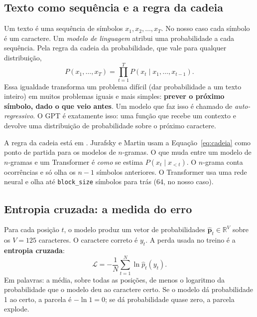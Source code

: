 \documentclass[11pt,a4paper]{article}
\newcommand{\R}{\mathbb{R}}
\begin{document}
\subsection{Texto como sequência e a regra da cadeia}

Um texto é uma sequência de símbolos $x_1, x_2, \dots, x_T$. No nosso caso cada símbolo é um caractere. Um \emph{modelo de linguagem} atribui uma probabilidade a cada sequência. Pela regra da cadeia da probabilidade, que vale para qualquer distribuição,
\begin{equation}
P(x_1, \dots, x_T) = \prod_{t=1}^{T} P(x_t \mid x_1, \dots, x_{t-1}).
\label{eq:cadeia}
\end{equation}
Essa igualdade transforma um problema difícil (dar probabilidade a um texto inteiro) em muitos problemas iguais e mais simples: \textbf{prever o próximo símbolo, dado o que veio antes}. Um modelo que faz isso é chamado de \emph{auto-regressivo}. O GPT é exatamente isso: uma função que recebe um contexto e devolve uma distribuição de probabilidade sobre o próximo caractere.

\begin{teoria}
A regra da cadeia está em \cite[cap.~3]{goodfellow}. Jurafsky e Martin \cite[cap.~3]{jurafsky} usam a Equação~\eqref{eq:cadeia} como ponto de partida para os modelos de $n$-gramas. O que muda entre um modelo de $n$-gramas e um Transformer é \emph{como} se estima $P(x_t \mid x_{<t})$. O $n$-grama conta ocorrências e só olha os $n-1$ símbolos anteriores. O Transformer usa uma rede neural e olha até \texttt{block\_size} símbolos para trás (64, no nosso caso).
\end{teoria}

\subsection{Entropia cruzada: a medida do erro}

Para cada posição $t$, o modelo produz um vetor de probabilidades $\hat{\bm p}_t \in \R^{V}$ sobre os $V = 125$ caracteres. O caractere correto é $y_t$. A perda usada no treino é a \textbf{entropia cruzada}:
\begin{equation}
\mathcal{L} = -\frac{1}{N}\sum_{t=1}^{N} \ln \hat p_t(y_t).
\label{eq:ce}
\end{equation}
Em palavras: a média, sobre todas as posições, de menos o logaritmo da probabilidade que o modelo deu ao caractere certo. Se o modelo dá probabilidade 1 ao certo, a parcela é $-\ln 1 = 0$; se dá probabilidade quase zero, a parcela explode.
\end{document}

